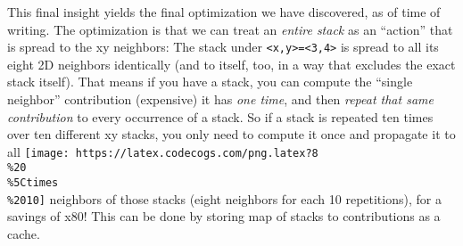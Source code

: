 \documentclass[]{article}
\begin{document}
This final insight yields the final optimization we have discovered, as of time
of writing. The optimization is that we can treat an \emph{entire stack} as an
``action'' that is spread to the xy neighbors: The stack under
\texttt{\textless{}x,y\textgreater{}=\textless{}3,4\textgreater{}} is spread to
all its eight 2D neighbors identically (and to itself, too, in a way that
excludes the exact stack itself). That means if you have a stack, you can
compute the ``single neighbor'' contribution (expensive) it has \emph{one time},
and then \emph{repeat that same contribution} to every occurrence of a stack. So
if a stack is repeated ten times over ten different xy stacks, you only need to
compute it once and propagate it to all
\texttt{[image: https://latex.codecogs.com/png.latex?8\\\%20\\\%5Ctimes\\\%2010]}
neighbors of those stacks (eight neighbors for each 10 repetitions), for a
savings of x80! This can be done by storing map of stacks to contributions as a
cache.
\end{document}
